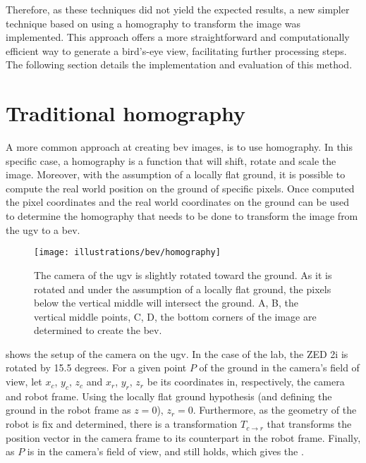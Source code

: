 Therefore, as these techniques did not yield the expected results, a new simpler technique based on using a homography to transform the image was implemented.
This approach offers a more straightforward and computationally efficient way to generate a bird’s-eye view, facilitating further processing steps.
The following section details the implementation and evaluation of this method.


\section{Traditional homography}\label{sec:traditional-homography}

A more common approach at creating \gls{bev} images, is to use homography.
In this specific case, a homography is a function that will shift, rotate and scale the image.
Moreover, with the assumption of a locally flat ground, it is possible to compute the real world
position on the ground of specific pixels.
Once computed the pixel coordinates and the real world coordinates on the ground can be used to determine the
homography that needs to be done to transform the image from the \gls{ugv} to a \gls{bev}.

\begin{figure}[ht!]
    \centering
    \texttt{[image: illustrations/bev/homography]}
    \caption{The camera of the \gls{ugv} is slightly rotated toward the ground. As it is rotated and under
    the assumption of a locally flat ground, the pixels below the vertical middle will intersect the ground.
    A, B, the vertical middle points, C, D, the bottom corners of the image are determined to create the \gls{bev}.}
    \label{fig:homography:homography}
\end{figure}


 shows the setup of the camera on the \gls{ugv}.
In the case of the lab, the ZED 2i is rotated by 15.5 degrees.
For a given point $P$ of the ground in the camera's field of view, let $x_c$, $y_c$, $z_c$ and $x_r$, $y_r$, $z_r$ be its
coordinates in, respectively, the camera and robot frame.
Using the locally flat ground hypothesis (and defining the ground in the robot frame as $z=0$), $z_r = 0$.
Furthermore, as the geometry of the robot is fix and determined, there is a transformation $T_{c\rightarrow r}$ that
transforms the position vector in the camera frame to its counterpart in the robot frame.
Finally, as $P$ is in the camera's field of view,  and  still holds, which gives
the .

